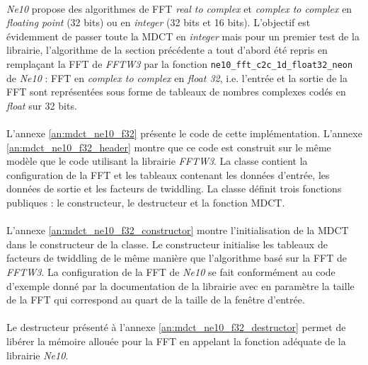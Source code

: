 \documentclass{article}
\begin{document}
    \paragraph{}
    \emph{Ne10} propose des algorithmes de FFT \emph{real to complex} et \emph{complex to complex} en \emph{floating point} (32 bits) ou en \emph{integer} (32 bits et 16 bits). L'objectif est évidemment de passer toute la MDCT en \emph{integer} mais pour un premier test de la librairie, l'algorithme de la section précédente a tout d'abord été repris en remplaçant la FFT de \emph{FFTW3} par la fonction \texttt{ne10\_fft\_c2c\_1d\_float32\_neon} de \emph{Ne10} : FFT en \emph{complex to complex} en \emph{float 32}, i.e. l'entrée et la sortie de la FFT sont représentées sous forme de tableaux de nombres complexes codés en \emph{float} sur 32 bits.

    \paragraph{}
    L'annexe \ref{an:mdct_ne10_f32} présente le code de cette implémentation. L'annexe \ref{an:mdct_ne10_f32_header} montre que ce code est construit sur le même modèle que le code utilisant la librairie \emph{FFTW3}. La classe contient la configuration de la FFT et les tableaux contenant les données d'entrée, les données de sortie et les facteurs de twiddling. La classe définit trois fonctions publiques : le constructeur, le destructeur et la fonction MDCT.

    \paragraph{}
    L'annexe \ref{an:mdct_ne10_f32_constructor} montre l'initialisation de la MDCT dans le constructeur de la classe. Le constructeur initialise les tableaux de facteurs de twiddling de le même manière que l'algorithme basé sur la FFT de \emph{FFTW3}. La configuration de la FFT de \emph{Ne10} se fait conformément au code d'exemple donné par la documentation de la librairie\cite{Ne10} avec en paramètre la taille de la FFT qui correspond au quart de la taille de la fenêtre d'entrée.

    \paragraph{}
    Le destructeur présenté à l'annexe \ref{an:mdct_ne10_f32_destructor} permet de libérer la mémoire allouée pour la FFT en appelant la fonction adéquate de la librairie \emph{Ne10}.
\end{document}
